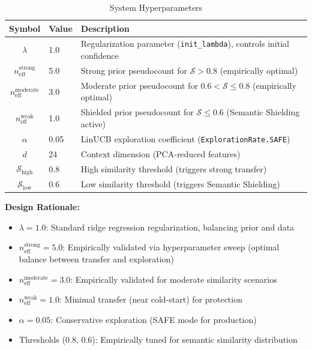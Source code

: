 \documentclass[sigconf,nonacm]{acmart}
\begin{document}
\begin{table}[h]
\centering
\caption{System Hyperparameters}
\label{tab:parameters}
\begin{tabular}{clp{5cm}}
\toprule
\textbf{Symbol} & \textbf{Value} & \textbf{Description} \\
\midrule
$\lambda$ & 1.0 & Regularization parameter (\texttt{init\_lambda}), controls initial confidence \\
$n_{\text{eff}}^{\text{strong}}$ & 5.0 & Strong prior pseudocount for $\mathcal{S} > 0.8$ (empirically optimal) \\
$n_{\text{eff}}^{\text{moderate}}$ & 3.0 & Moderate prior pseudocount for $0.6 < \mathcal{S} \leq 0.8$ (empirically optimal) \\
$n_{\text{eff}}^{\text{weak}}$ & 1.0 & Shielded prior pseudocount for $\mathcal{S} \leq 0.6$ (Semantic Shielding active) \\
$\alpha$ & 0.05 & LinUCB exploration coefficient (\texttt{ExplorationRate.SAFE}) \\
$d$ & 24 & Context dimension (PCA-reduced features) \\
$\mathcal{S}_{\text{high}}$ & 0.8 & High similarity threshold (triggers strong transfer) \\
$\mathcal{S}_{\text{low}}$ & 0.6 & Low similarity threshold (triggers Semantic Shielding) \\
\bottomrule
\end{tabular}
\end{table}

\textbf{Design Rationale:}
\begin{itemize}
    \item $\lambda = 1.0$: Standard ridge regression regularization, balancing prior and data
    \item $n_{\text{eff}}^{\text{strong}} = 5.0$: Empirically validated via hyperparameter sweep (optimal balance between transfer and exploration)
    \item $n_{\text{eff}}^{\text{moderate}} = 3.0$: Empirically validated for moderate similarity scenarios
    \item $n_{\text{eff}}^{\text{weak}} = 1.0$: Minimal transfer (near cold-start) for protection
    \item $\alpha = 0.05$: Conservative exploration (SAFE mode for production)
    \item Thresholds (0.8, 0.6): Empirically tuned for semantic similarity distribution
\end{itemize}
\end{document}
